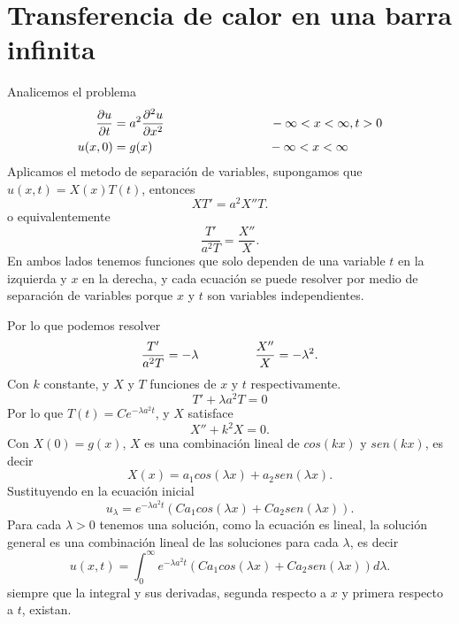\documentclass[11pt]{book}
\theoremstyle{plain}
\theoremstyle{definition}
\begin{document}
\section{Transferencia de calor en una barra infinita}
Analicemos el problema
\setcounter{equation}{0}
\begin{align}
    \frac{\partial u}{\partial t} &= a^{2} \frac{\partial^2 u}{\partial x^2} \hspace{30mm} -\infty<x<\infty, t > 0\\ 
    u(x,0)&= g(x) \hspace{33mm} -\infty<x<\infty
\end{align}
Aplicamos el metodo de separación de variables, supongamos que $u(x,t) = X(x)T(t)$, entonces
\[
XT' = a^{2}X''T
.\]
o equivalentemente
\[
\frac{T'}{a^{2}T} = \frac{X''}{X}
.\]
En ambos lados tenemos funciones que solo dependen de una variable $t$ en la izquierda y $x$ en la derecha, y cada ecuación se puede resolver por medio de separación de variables porque $x$ y $t$ son variables independientes.

Por lo que podemos resolver
\[
\frac{T'}{a^{2}T} = -\lambda \hspace{16mm} \frac{X''}{X} = - \lambda^{2}
.\]
Con $k$ constante, y $X$ y $T$ funciones de $x$ y $t$ respectivamente.
\[
T' + \lambda a^{2}T = 0
\]
Por lo que $T(t) = C e^{-\lambda a^{2}t}$, y $X$ satisface
\[
X'' + k^{2}X = 0
.\]
Con $X(0) = g(x)$, $X$ es una combinación lineal de $cos(kx)$ y $sen(kx)$, es decir
\[
X(x) = a_{1}cos(\lambda x) + a_{2}sen(\lambda x)
.\]
Sustituyendo en la ecuación inicial
\[
u_{\lambda} = e^{-\lambda a^{2}t}(Ca_{1}cos(\lambda x) + Ca_{2}sen(\lambda x))
.\]
Para cada $\lambda > 0$ tenemos una solución, como la ecuación es lineal, la solución general es una combinación lineal de las soluciones para cada $\lambda$, es decir
\[
u(x,t) = \int_{0}^{\infty} e^{-\lambda a^{2}t}(Ca_{1}cos(\lambda x) + Ca_{2}sen(\lambda x))d\lambda
.\]
siempre que la integral y sus derivadas, segunda respecto a $x$ y primera respecto a $t$, existan.
\end{document}
